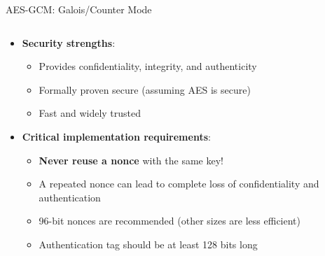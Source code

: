 \documentclass[aspectratio=169, lualatex, handout]{beamer}
\begin{document}
\begin{frame}{AES-GCM: Galois/Counter Mode}
	\begin{columns}[c]
		\begin{column}{1\textwidth}
			\begin{itemize}
				\item \textbf{Security strengths}:
				      \begin{itemize}
					      \item Provides confidentiality, integrity, and authenticity
					      \item Formally proven secure (assuming AES is secure)
					      \item Fast and widely trusted
				      \end{itemize}
				\item \textbf{Critical implementation requirements}:
				      \begin{itemize}
					      \item \textbf{Never reuse a nonce} with the same key!
					      \item A repeated nonce can lead to complete loss of confidentiality and authentication
					      \item 96-bit nonces are recommended (other sizes are less efficient)
					      \item Authentication tag should be at least 128 bits long
				      \end{itemize}
			\end{itemize}
		\end{column}
	\end{columns}
\end{frame}
\end{document}
